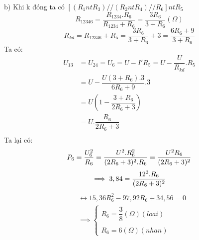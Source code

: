 \documentclass[50pt]{article}
\begin{document}
b) Khi k đóng ta có $[(R_{1} nt R_{3}) // (R_{2} nt R_{4}) // R_{6}] nt R_{5}$\\
\begin{equation*}
    R_{12346} = \dfrac{R_{1234}.R_{6}}{R_{1234} + R_{6}} = \dfrac{3R_{6}}{3 + R_{6}} (\Omega)
\end{equation*}
\begin{equation*}
    R_{kd} = R_{12346} + R_{5} = \dfrac{3R_{6}}{3 + R_{6}} + 3 = \dfrac{6R_{6} + 9}{3 + R_{6}}
\end{equation*}
Ta có:
\begin{equation*}
    \begin{aligned}
        U_{13} & = U_{24} = U_{6} = U - I'R_{5} = U - \dfrac{U}{R_{kd}}.R_{5} \\
               & = U - \dfrac{U(3 + R_{6}).3}{6R_{6} + 9}.3 \\
               & = U(1 - \dfrac{3 + R_{6}}{2R_{6} + 3}) \\
               & = U.\dfrac{R_{6}}{2R_{6} + 3} \\
    \end{aligned}
\end{equation*}
Ta lại có:
\begin{equation*}
P_{6} = \dfrac{U_{6}^2}{R_{6}} = \dfrac{U^2.R_{6}^2}{(2R_{6} + 3)^2.R_{6}} = \dfrac{U^2R_{6}}{(2R_{6} + 3)^2}\\
\end{equation*}
\begin{equation*}
    \implies 3,84 = \dfrac{12^2.R_{6}}{(2R_{6} + 3)^2}\\
\end{equation*}
\begin{equation*}
    \begin{aligned}
        & \leftrightarrow 15,36R_{6}^2 - 97,92R_{6} + 34,56 = 0\\
        & \implies \begin{cases}
            R_{6} = \dfrac{3}{8} (\Omega) (loai)\\
            \\
            R_{6} = 6 (\Omega) (nhan)
        \end{cases}
    \end{aligned}
\end{equation*}
\end{document}
